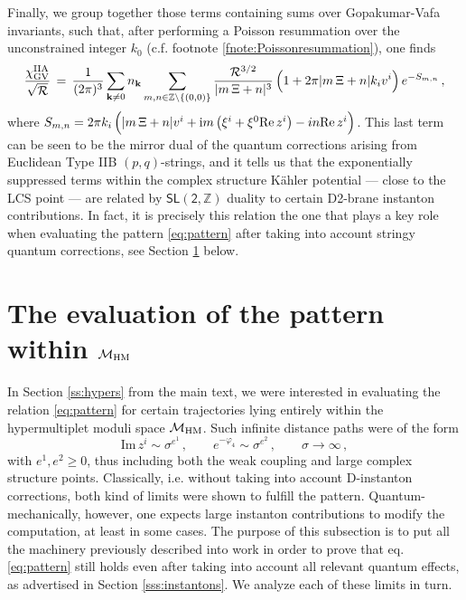 Finally, we group together those terms containing sums over Gopakumar-Vafa invariants, such that, after performing a Poisson resummation over the unconstrained integer $k_0$ (c.f. footnote \ref{fnote:Poissonresummation}), one finds \cite{Robles-Llana:2007bbv}
%
\begin{align}\label{eq:chiGV}
	\frac{\chi^{\rm IIA}_{\text{GV}}}{\sqrt{\mathcal{R}}}\, =\, \frac{1}{(2\pi)^3} \sum_{\textbf{k}\neq 0} n_{\textbf{k}} \sum_{m, n \in \mathbb{Z}\setminus \lbrace (0,0) \rbrace} \frac{\mathcal{R}^{3/2}}{|m\, \Xi +n|^3} \left( 1+2\pi |m\, \Xi +n| k_i v^{i}\right) e^{-S_{m, n}}\, ,
\end{align}
%
where $S_{m, n}= 2 \pi k_i \left( |m\, \Xi +n| v^i + \text{i} m \left( \xi^i+\xi^0 \text{Re}\, z^i \right) -in \text{Re}\, z^i\right)$. This last term can be seen to be the mirror dual of the quantum corrections arising from Euclidean Type IIB $(p,q)$-strings, and it tells us that the exponentially suppressed terms within the complex structure K\"ahler potential --- close to the LCS point --- are related by $\mathsf{SL(2, \mathbb{Z})}$ duality to certain D2-brane instanton contributions. In fact, it is precisely this relation the one that plays a key role when evaluating the pattern \eqref{eq:pattern} after taking into account stringy quantum corrections, see Section \ref{ss:detailshyper} below.
	
\section{The evaluation of the pattern within $\mathcal{M}_{\rm HM}$}
\label{ss:detailshyper}
	
In Section \ref{ss:hypers} from the main text, we were interested in evaluating the relation \eqref{eq:pattern} for certain trajectories lying entirely within the hypermultiplet moduli space $\mathcal{M}_{\rm HM}$. Such infinite distance paths were of the form
%
\begin{equation}\label{eq:generictrajII}
	\text{Im}\, z^i \sim \sigma^{e^1}\, , \qquad e^{-\varphi_4}\sim \sigma^{e^2}\, , \qquad \sigma \to \infty\, ,
\end{equation}
%
with $e^1, e^2 \geq 0$, thus including both the weak coupling and large complex structure points. Classically, i.e. without taking into account D-instanton corrections, both kind of limits were shown to fulfill the pattern. Quantum-mechanically, however, one expects large instanton contributions to modify the computation, at least in some cases. The purpose of this subsection is to put all the machinery previously described into work in order to prove that eq. \eqref{eq:pattern} still holds even after taking into account all relevant quantum effects, as advertised in Section \ref{sss:instantons}. We analyze each of these limits in turn.	
	
